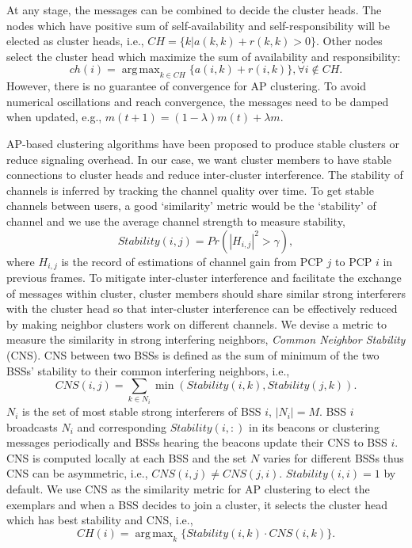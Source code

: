 \documentclass[10pt, conference, letterpaper]{IEEEtran}
\DeclareMathOperator*{\argmax}{arg\,max}
\begin{document}
At any stage, the messages can be combined to decide the cluster heads. The nodes which have positive sum of self-availability and self-responsibility will be elected as cluster heads, i.e., 
$CH = \{k|a(k,k) + r(k,k)>0\}$. Other nodes select the cluster head which maximize the sum of availability and responsibility:
$$ch(i) = \argmax_{k\in CH}\{a(i,k)+r(i,k)\}, \forall i\notin CH.$$
However, there is no guarantee of convergence for AP clustering. To avoid numerical oscillations and reach convergence, the messages need to be damped when updated, e.g., $m(t+1) = (1-\lambda)m(t) + \lambda m$. 

AP-based clustering algorithms have been proposed to produce stable clusters \cite{apvanet} or reduce signaling overhead\cite{apd2d}. In our case, we want cluster members to have stable connections to cluster heads and reduce inter-cluster interference. The stability of channels is inferred by tracking the channel quality over time. To get stable channels between users, a good `similarity' metric would be the `stability' of channel and we use the average channel strength to measure stability,
$$Stability(i,j)=Pr(|H_{i,j}|^2>\gamma),$$ 
where $H_{i,j}$ is the record of estimations of channel gain from PCP $j$ to PCP $i$ in previous frames. To mitigate inter-cluster interference and facilitate the exchange of messages within cluster, cluster members should share similar strong interferers with the cluster head so that inter-cluster interference can be effectively reduced by making neighbor clusters work on different channels. We devise a metric to measure the similarity in strong interfering neighbors, \emph{Common Neighbor Stability} (CNS). CNS between two BSSs is defined as the sum of minimum of the two BSSs' stability to their common interfering neighbors, i.e.,
\begin{equation}\label{eq:CNS}
CNS(i,j) = \sum_{k\in N_i}{\min(Stability(i,k), Stability(j,k))}.
\end{equation}
$N_i$ is the set of most stable strong interferers of BSS $i$, $|N_i| = M$. BSS $i$ broadcasts $N_i$ and corresponding $Stability(i,:)$ in its beacons or clustering messages periodically and BSSs hearing the beacons update their CNS to BSS $i$. CNS is computed locally at each BSS and the set $N$ varies for different BSSs thus CNS can be asymmetric, i.e., $CNS(i,j)\neq CNS(j,i)$.
$Stability(i,i) = 1$ by default. We use CNS as the similarity metric for AP clustering to elect the exemplars and when a BSS decides to join a cluster, it selects the cluster head which has best stability and CNS, i.e.,
$$CH(i) = \argmax_k \{Stability(i,k)\cdot CNS(i,k)\}.$$
\end{document}
